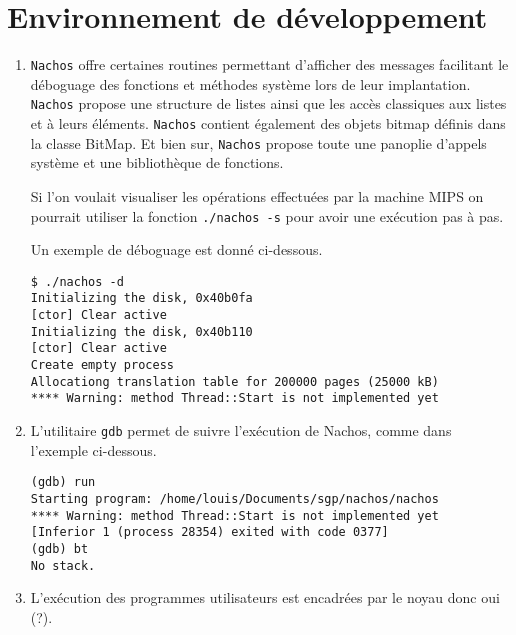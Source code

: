 \documentclass{article}
\begin{document}
\section{Environnement de développement}

\begin{enumerate}
\item {\tt Nachos} offre certaines routines permettant d’afficher des messages facilitant le déboguage des fonctions et méthodes système lors de leur implantation. {\tt Nachos} propose une structure de listes ainsi que les accès classiques aux listes et à leurs éléments. {\tt Nachos} contient également des objets bitmap définis dans la classe BitMap. Et bien sur, {\tt Nachos} propose toute une panoplie d'appels système et une bibliothèque de fonctions.

  Si l'on voulait visualiser les opérations effectuées par la machine MIPS on pourrait utiliser la fonction {\tt ./nachos -s} pour avoir une exécution pas à pas.

  Un exemple de déboguage est donné ci-dessous.
\begin{verbatim}
$ ./nachos -d
Initializing the disk, 0x40b0fa
[ctor] Clear active
Initializing the disk, 0x40b110
[ctor] Clear active
Create empty process
Allocationg translation table for 200000 pages (25000 kB)
**** Warning: method Thread::Start is not implemented yet
\end{verbatim}

\item L'utilitaire \texttt{gdb} permet de suivre l'exécution de Nachos, comme dans l'exemple ci-dessous.
\begin{verbatim}
(gdb) run 
Starting program: /home/louis/Documents/sgp/nachos/nachos 
**** Warning: method Thread::Start is not implemented yet
[Inferior 1 (process 28354) exited with code 0377]
(gdb) bt
No stack.
\end{verbatim}

\item L'exécution des programmes utilisateurs est encadrées par le noyau donc oui (?).
\end{enumerate}
\end{document}
